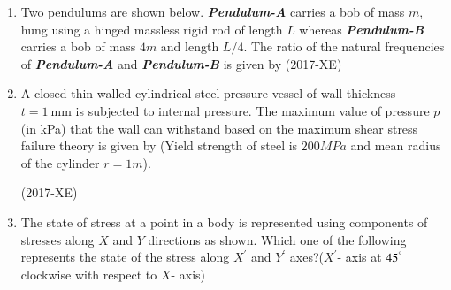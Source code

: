\documentclass[journal]{IEEEtran}
\begin{document}
\begin{enumerate}
\begin{enumerate}
\end{enumerate}
\item Two pendulums are shown below. \textbf{\textit{Pendulum-A}} carries a bob of mass $m,$ hung using a hinged massless rigid rod of length $L$ whereas \textbf{\textit{Pendulum-B}} carries a bob of mass $4m$ and length $L/4$. The ratio of the natural frequencies of \textbf{\textit{Pendulum-A}} and \textbf{\textit{Pendulum-B}} is given by \hfill(2017-XE)

\begin{enumerate}
\end{enumerate}
\item A closed thin-walled cylindrical steel pressure vessel of wall thickness $t = 1 \ \text{mm}$ is subjected to internal pressure. The maximum value of pressure $p$ (in kPa) that the wall can withstand based on the maximum shear stress failure theory is given by (Yield strength of steel is $200  MPa$ and mean radius of the cylinder $r = 1 m$).

\hfill(2017-XE)
\begin{enumerate}
\end{enumerate}
\item The state of stress at a point in a body is represented using components of stresses along $X$ and $Y$ directions as shown. Which one of the following represents the state of the stress along $X^\prime$ and $Y^\prime$ axes?($X^\prime$- axis at $45^\degree$ clockwise with respect to $X$- axis)


\end{enumerate}
\end{document}
